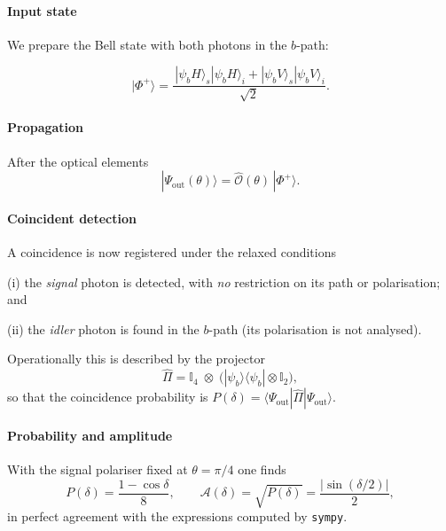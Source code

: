 \documentclass{article}
\begin{document}
\paragraph{Input state}

We prepare the Bell state with both photons in the \(b\)-path:

\[
|\Phi^{+}\rangle=
\frac{\,|\psi_bH\rangle_{\!s}|\psi_bH\rangle_{\!i}
      +|\psi_bV\rangle_{\!s}|\psi_bV\rangle_{\!i}}{\sqrt{2}}.
\]

\paragraph{Propagation}

After the optical elements
\[
|\Psi_{\mathrm{out}}(\theta)\rangle
=\hat{\mathcal{O}}(\theta)\,|\Phi^{+}\rangle.
\]

\paragraph{Coincident detection}

A coincidence is now registered under the relaxed conditions

(i) the \emph{signal} photon is detected, with \emph{no} restriction on
its path or polarisation; and

(ii) the \emph{idler} photon is found in the \(b\)-path
(its polarisation is not analysed).

Operationally this is described by the projector
\[
\hat{\Pi}=\mathbb{I}_{4}\;\otimes\;
\bigl(|\psi_b\rangle\langle\psi_b|\otimes\mathbb{I}_{2}\bigr),
\]
so that the coincidence probability is
\(P(\delta)=\langle\Psi_{\mathrm{out}}|\hat{\Pi}|\Psi_{\mathrm{out}}\rangle.\)
\]

\paragraph{Probability and amplitude}

With the signal polariser fixed at \(\theta=\pi/4\) one finds
\[
P(\delta)=\frac{1-\cos\delta}{8},\qquad
\mathcal{A}(\delta)=\sqrt{P(\delta)}
                  =\frac{\bigl|\sin(\delta/2)\bigr|}{2},
\]
in perfect agreement with the expressions computed by
\texttt{sympy}.
\end{document}

